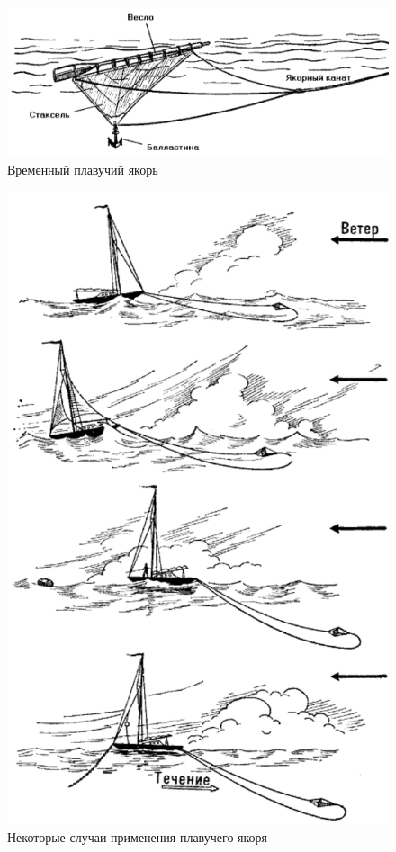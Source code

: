 \documentclass[a4paper, 12pt, twoside, final]{scrbook}
\begin{document}
\begin{figure}[htbp]
   \centering
   \includegraphics{pics/119_Vrem_plav_yakor} %
   \caption{Временный плавучий якорь}
   \label{fig:119}
\end{figure}

\begin{figure}[htbp]
   \centering
   \includegraphics{pics/118_Plav_yakor} %
   \caption{Некоторые случаи применения плавучего якоря}
   \label{fig:118}
\end{figure}
\end{document}
